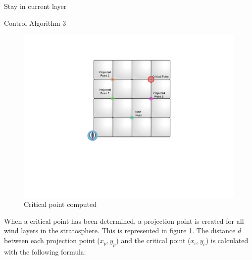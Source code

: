 \begin{algorithm}[H]
 \Else
 {Stay in current layer}
 \caption{Control Algorithm 3}
 \label{alg3}
\end{algorithm}

\begin{figure}
    \centering
    \includegraphics[width=\textwidth, trim=5cm 7cm 5cm 3.3cm, clip]{graphics/projectedPoints.pdf}
    \caption{Critical point computed}
    \label{fig:critical}
\end{figure}

When a critical point has been determined, a projection point is created for all wind layers in the stratosphere. This is represented in figure \ref{fig:critical}. The distance $d$ between each projection point ($x_p, y_p$) and the critical point ($x_c,y_c$) is calculated with the following formula:

